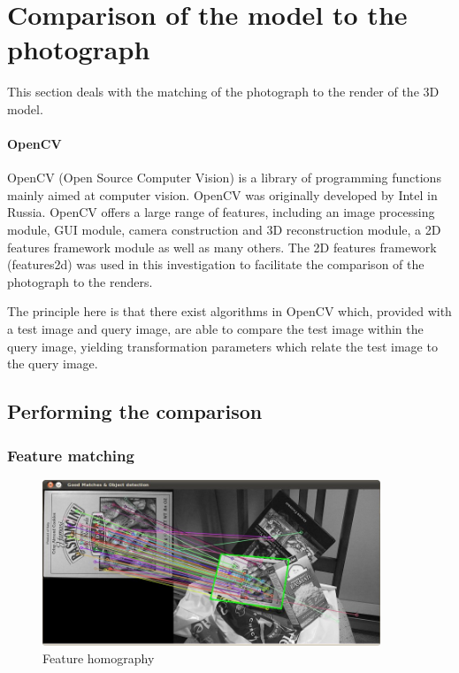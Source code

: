 \documentclass[11pt,a4paper]{report}
\begin{document}
		\section{Comparison of the model to the photograph}
			This section deals with the matching of the photograph to the render of the 3D model.
			
			\paragraph{OpenCV}
				OpenCV (Open Source Computer Vision) is a library of programming functions mainly aimed at computer vision. OpenCV was originally developed by Intel in Russia. OpenCV offers a large range of features, including an image processing module, GUI module, camera construction and 3D reconstruction module, a 2D features framework module as well as many others. The 2D features framework (features2d) was used in this investigation to facilitate the comparison of the photograph to the renders. 
				
				The principle here is that there exist algorithms in OpenCV which, provided with a test image and query image, are able to compare the test image within the query image, yielding transformation parameters which relate the test image to the query image.
			
			\subsection{Performing the comparison}
				\subsubsection{Feature matching}
					\begin{figure}[H]
						\centering
						\includegraphics[width=0.9\textwidth]{feature_homography_example}
						\caption{Feature homography}
					\end{figure}
					
\end{document}
